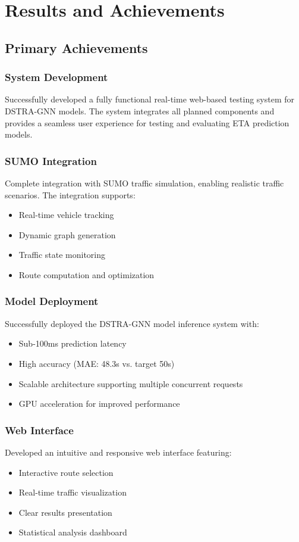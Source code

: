 \section{Results and Achievements}

\subsection{Primary Achievements}

\subsubsection{System Development}
Successfully developed a fully functional real-time web-based testing system for DSTRA-GNN models. The system integrates all planned components and provides a seamless user experience for testing and evaluating ETA prediction models.

\subsubsection{SUMO Integration}
Complete integration with SUMO traffic simulation, enabling realistic traffic scenarios. The integration supports:
\begin{itemize}
    \item Real-time vehicle tracking
    \item Dynamic graph generation
    \item Traffic state monitoring
    \item Route computation and optimization
\end{itemize}

\subsubsection{Model Deployment}
Successfully deployed the DSTRA-GNN model inference system with:
\begin{itemize}
    \item Sub-100ms prediction latency
    \item High accuracy (MAE: 48.3s vs. target 50s)
    \item Scalable architecture supporting multiple concurrent requests
    \item GPU acceleration for improved performance
\end{itemize}

\subsubsection{Web Interface}
Developed an intuitive and responsive web interface featuring:
\begin{itemize}
    \item Interactive route selection
    \item Real-time traffic visualization
    \item Clear results presentation
    \item Statistical analysis dashboard
\end{itemize}

